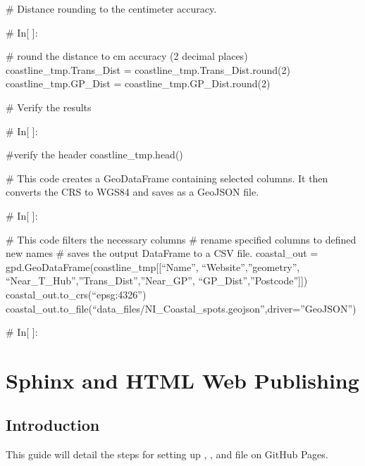 \documentclass[letterpaper,10pt,english]{sphinxmanual}
\begin{document}
\sphinxAtStartPar
\# Distance rounding to the centimeter accuracy.

\sphinxAtStartPar
\# In{[} {]}:

\sphinxAtStartPar
\# round the distance to cm accuracy (2 decimal places)
coastline\_tmp.Trans\_Dist = coastline\_tmp.Trans\_Dist.round(2)
coastline\_tmp.GP\_Dist = coastline\_tmp.GP\_Dist.round(2)

\sphinxAtStartPar
\# Verify the results

\sphinxAtStartPar
\# In{[} {]}:

\sphinxAtStartPar
\#verify the header
coastline\_tmp.head()

\sphinxAtStartPar
\# This code creates a GeoDataFrame containing selected columns. It then converts the CRS to WGS84 and saves as a GeoJSON file.

\sphinxAtStartPar
\# In{[} {]}:

\sphinxAtStartPar
\# This code filters the necessary columns
\# rename specified columns to defined new names
\# saves the output DataFrame to a CSV file.
coastal\_out = gpd.GeoDataFrame(coastline\_tmp{[}{[}“Name”, “Website”,”geometry”, “Near\_T\_Hub”,”Trans\_Dist”,”Near\_GP”, “GP\_Dist”,”Postcode”{]}{]})
coastal\_out.to\_crs(“epsg:4326”)
coastal\_out.to\_file(“data\_files/NI\_Coastal\_spots.geojson”,driver=”GeoJSON”)

\sphinxAtStartPar
\# In{[} {]}:

\sphinxstepscope


\chapter{Sphinx and HTML Web Publishing}
\label{\detokenize{Other/Sphinx_and_HTML_Web_Publishing:sphinx-and-html-web-publishing}}\label{\detokenize{Other/Sphinx_and_HTML_Web_Publishing::doc}}

\section{Introduction}
\label{\detokenize{Other/Sphinx_and_HTML_Web_Publishing:introduction}}
\sphinxAtStartPar
This guide will detail the steps for setting up , , and  file on GitHub Pages.
\end{document}
